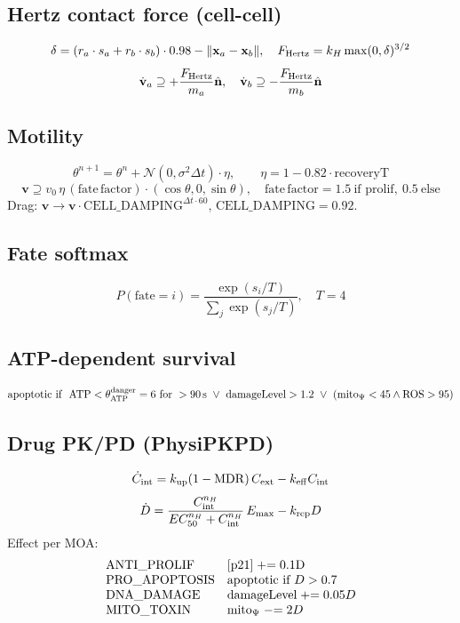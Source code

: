 \documentclass[11pt,a4paper]{article}
\newcommand{\eq}[1]{\begin{equation}#1\end{equation}}
\begin{document}
\subsection{Hertz contact force (cell-cell)}
\eq{ \delta = (r_a\cdot s_a + r_b\cdot s_b)\cdot 0.98 - \|\mathbf x_a-\mathbf x_b\|,\quad F_{\rm Hertz}=k_H\max(0,\delta)^{3/2} }
\eq{ \dot{\mathbf v}_a \supseteq +\frac{F_{\rm Hertz}}{m_a}\hat{\mathbf n},\quad \dot{\mathbf v}_b \supseteq -\frac{F_{\rm Hertz}}{m_b}\hat{\mathbf n} }

\subsection{Motility}
\eq{ \theta^{n+1}=\theta^n+\mathcal N(0,\sigma^2\Delta t)\cdot\eta,\qquad \eta=1-0.82\cdot\mathrm{recoveryT} }
\eq{ \mathbf v\supseteq v_0\,\eta\,(\mathrm{fate\,factor})\cdot(\cos\theta,0,\sin\theta),\quad \mathrm{fate\,factor}=1.5\ \text{if prolif},\ 0.5\ \text{else} }
Drag: $\mathbf v\to\mathbf v\cdot\mathrm{CELL\_DAMPING}^{\Delta t\cdot 60}$, $\mathrm{CELL\_DAMPING}=0.92$.

\subsection{Fate softmax}
\eq{ P(\text{fate}=i)=\frac{\exp(s_i/T)}{\sum_j\exp(s_j/T)},\quad T=4 }

\subsection{ATP-dependent survival}
\eq{ \text{apoptotic if }\ \mathrm{ATP}<\theta_{\rm ATP}^{\rm danger}=6\ \text{for}\ >\SI{90}{s}\ \lor\ \mathrm{damageLevel}>1.2\ \lor\ (\mathrm{mito}_\Psi<45 \land \mathrm{ROS}>95) }

\subsection{Drug PK/PD (PhysiPKPD)}
\eq{ \dot C_{\rm int}=k_{\rm up}(1-\mathrm{MDR})\,C_{\rm ext}-k_{\rm eff}C_{\rm int} }
\eq{ \dot D = \frac{C_{\rm int}^{n_H}}{EC_{50}^{n_H}+C_{\rm int}^{n_H}}\,E_{\max} - k_{\rm rep} D }
Effect per MOA:
\[
\begin{array}{ll}
\text{ANTI\_PROLIF} & [\rm p21]\mathrel{+}=0.1 D\\
\text{PRO\_APOPTOSIS} & \text{apoptotic if } D>0.7\\
\text{DNA\_DAMAGE} & \text{damageLevel}\mathrel{+}=0.05 D\\
\text{MITO\_TOXIN} & \mathrm{mito}_\Psi\mathrel{-}=2 D
\end{array}
\]
\end{document}
